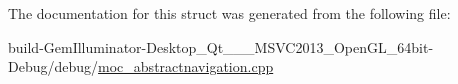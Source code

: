 The documentation for this struct was generated from the following file\+:\begin{DoxyCompactItemize}
\item 
build-\/\+Gem\+Illuminator-\/\+Desktop\+\_\+\+Qt\+\_\+\_\+\_\+\+M\+S\+V\+C2013\+\_\+\+Open\+G\+L\+\_\+64bit-\/\+Debug/debug/\hyperlink{moc__abstractnavigation_8cpp}{moc\+\_\+abstractnavigation.\+cpp}\end{DoxyCompactItemize}

